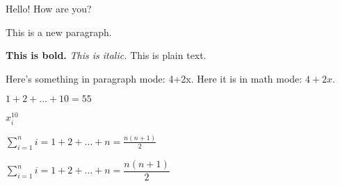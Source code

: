 \documentclass{article}
\begin{document}
    Hello!
How are you?

    This is a new paragraph.

    \textbf{This is bold.} \textit{This is italic.} This is plain text.

    
    Here's something in paragraph mode: 4+2x.
    Here it is in math mode: $4+2x$.

    $1+2+\ldots+10 = 55$

    $x_{i}^{10}$

    $\sum_{i=1}^{n} i = 1 + 2 + \ldots + n = \frac{n(n+1)}{2}$

    $\sum\limits_{i=1}^{n} i = 1 + 2 + \ldots + n = \dfrac{n(n+1)}{2}$
\end{document}
